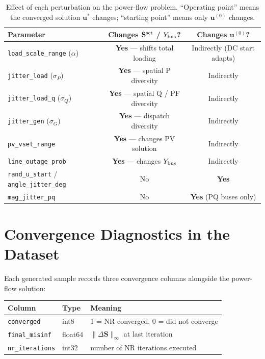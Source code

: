 \documentclass{article}
\begin{document}
\begin{table}[h]
\centering
\caption{Effect of each perturbation on the power-flow problem.
  ``Operating point'' means the converged solution $\mathbf{u}^*$ changes;
  ``starting point'' means only $\mathbf{u}^{(0)}$ changes.}
\label{tab:what_changes}
\begin{tabular}{lcc}
\toprule
Parameter & Changes $\mathbf{S}^{\rm set}$ / $Y_{\rm bus}$? & Changes $\mathbf{u}^{(0)}$? \\
\midrule
\texttt{load\_scale\_range} ($\alpha$) & \textbf{Yes} --- shifts total loading & Indirectly (DC start adapts) \\
\texttt{jitter\_load} ($\sigma_P$)     & \textbf{Yes} --- spatial P diversity  & Indirectly \\
\texttt{jitter\_load\_q} ($\sigma_Q$)  & \textbf{Yes} --- spatial Q / PF diversity & Indirectly \\
\texttt{jitter\_gen} ($\sigma_G$)      & \textbf{Yes} --- dispatch diversity    & Indirectly \\
\texttt{pv\_vset\_range}               & \textbf{Yes} --- changes PV solution   & Indirectly \\
\texttt{line\_outage\_prob}            & \textbf{Yes} --- changes $Y_{\rm bus}$ & Indirectly \\
\hline
\texttt{rand\_u\_start} / \texttt{angle\_jitter\_deg} & No & \textbf{Yes} \\
\texttt{mag\_jitter\_pq}               & No & \textbf{Yes} (PQ buses only) \\
\bottomrule
\end{tabular}
\end{table}

\section{Convergence Diagnostics in the Dataset}

Each generated sample records three convergence columns alongside the power-flow
solution:

\begin{center}
\begin{tabular}{lll}
\toprule
Column & Type & Meaning \\
\midrule
\texttt{converged}     & int8    & 1 = NR converged, 0 = did not converge \\
\texttt{final\_misinf} & float64 & $\|\Delta \mathbf{S}\|_\infty$ at last iteration \\
\texttt{nr\_iterations}& int32   & number of NR iterations executed \\
\bottomrule
\end{tabular}
\end{center}
\end{document}
